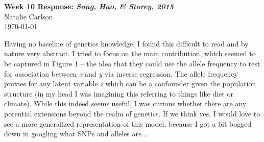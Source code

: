 \documentclass[12pt]{article}
\begin{document}
\begin{center}
  \Large \textbf{Week 10 Response: \textit{Song, Hao, \& Storey, 2015}} \\
  \vspace{0.1in}
  \normalsize Natalie Carlson \\
  \today
\end{center}

Having no baseline of genetics knowledge, I found this difficult to read and by nature very abstract. I tried to focus on the main contribution, which seemed to be captured in Figure 1 -- the idea that they could use the allele frequency to test for association between \textit{x} and \textit{y} via inverse regression. The allele frequency proxies for any latent variable \textit{z} which can be a confounder given the population structure (in my head I was imagining this referring to things like diet or climate). While this indeed seems useful, I was curious whether there are any potential extensions beyond the realm of genetics. If we think yes, I would love to see a more generalized representation of this model, because I got a bit bogged down in googling what SNPs and alleles are...
\end{document}
